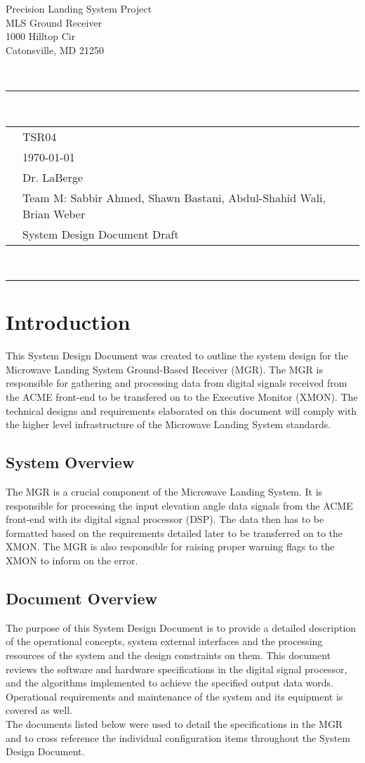 \documentclass[11pt]{article}
\newcommand{\header}[5]{
    \begin{centering}
        \parbox{6.8in}{
        \begin{flushright}
        \begin{spacing}{.8}{
        \fontfamily{cmss}{\large{\textbf{#1}}\\}}
        \small{
            #2\\
            #3\\
            #4\\
            #5}\\
        \end{spacing}
        \end{flushright}
        \vspace{-7.5mm}
        }\\
        \rule{\textwidth}{0.5pt}\\
        \vspace{-4mm}
    \end{centering}
}
\newcommand{\documentinfo}[5]{
    \begin{centering}
        \parbox{6.8in}{
        \begin{spacing}{1}
            \begin{flushleft}
                \begin{tabular}{l l}
                    \fontfamily{cmss}{\textbf{DOC \#: }} & #1 \\
                    \fontfamily{cmss}{\textbf{DATE: }} & #2 \\
                    \fontfamily{cmss}{\textbf{TO: }} & #3 \\
                    \fontfamily{cmss}{\textbf{FROM: }} & #4 \\
                    \fontfamily{cmss}{\textbf{SUBJECT: }} & #5 \\
                \end{tabular}\\
                \rule{\textwidth}{1pt}
            \end{flushleft}
        \end{spacing}
        }
    \end{centering}
}
\begin{document}
    \header{CMPE349}{Precision Landing System Project}{MLS Ground Receiver}{1000 Hilltop Cir}{Catonsville, MD 21250}
    \documentinfo{TSR04}{\today}{Dr. LaBerge}{Team M: Sabbir Ahmed, Shawn Bastani, Abdul-Shahid Wali, Brian Weber}{System Design Document Draft}

    \section{Introduction}
    This System Design Document was created to outline the system design for the Microwave Landing System Ground-Based Receiver (MGR). The MGR is responsible for gathering and processing data from digital signals received from the ACME front-end to be transfered on to the Executive Monitor (XMON). The technical designs and requirements elaborated on this document will comply with the higher level infrastructure of the Microwave Landing System standards.

        \subsection{System Overview}
        The MGR is a crucial component of the Microwave Landing System. It is responsible for processing the input elevation angle data signals from the ACME front-end with its digital signal processor (DSP). The data then has to be formatted based on the requirements detailed later to be transferred on to the XMON. The MGR is also responsible for raising proper warning flags to the XMON to inform on the error.

        \subsection{Document Overview}
        The purpose of this System Design Document is to provide a detailed description of the operational concepts, system external interfaces and the processing resources of the system and the design constraints on them. This document reviews the software and hardware specifications in the digital signal processor, and the algorithms implemented to achieve the specified output data words. Operational requirements and maintenance of the system and its equipment is covered as well.\\

        The documents listed below were used to detail the specifications in the MGR and to cross reference the individual configuration items throughout the System Design Document.
\end{document}
